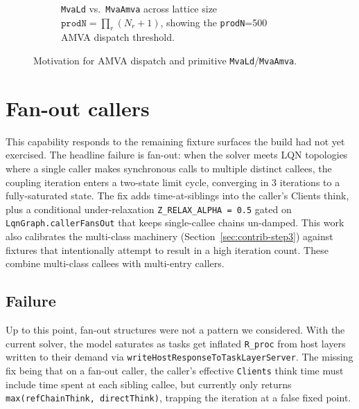 \begin{figure}[!htbp]
\begin{subfigure}[t]{0.32\textwidth}
\caption{\texttt{MvaLd} vs.\ \texttt{MvaAmva} across lattice size $\texttt{prodN}=\prod_r(N_r{+}1)$, showing the \texttt{prodN}=500 AMVA dispatch threshold.}
\end{subfigure}
\caption{Motivation for AMVA dispatch and primitive \texttt{MvaLd}/\texttt{MvaAmva}.}
\label{fig:cs-step4-mva}
\end{figure}





\section{Fan-out callers}
\label{sec:contrib-step5}
This capability responds to the remaining fixture surfaces the build had not yet exercised. The headline failure is fan-out: when the solver meets LQN topologies where a single caller makes synchronous calls to multiple distinct callees, the coupling iteration enters a two-state limit cycle, converging in 3 iterations to a fully-saturated state. The fix adds time-at-siblings into the caller's Clients think, plus a conditional under-relaxation \texttt{Z\_RELAX\_ALPHA = 0.5} gated on \texttt{LqnGraph.callerFansOut} that keeps single-callee chains un-damped. This work also calibrates the multi-class machinery (Section~\ref{sec:contrib-step3}) against fixtures that intentionally attempt to result in a high iteration count. These combine multi-class callees with multi-entry callers.

\subsection{Failure}

Up to this point, fan-out structures were not a pattern we considered. With the current solver, the model saturates as tasks get inflated \texttt{R\_proc} from host layers written to their demand via \texttt{writeHostResponseToTaskLayerServer}. The missing fix being that on a fan-out caller, the caller's effective \texttt{Clients} think time must include time spent at each sibling callee, but currently only returns \texttt{max(refChainThink, directThink)}, trapping the iteration at a false fixed point.


